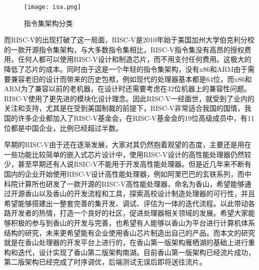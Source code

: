 \begin{figure}[htb]
    \centering
    \setlength\tabcolsep{3pt}  %
    \vspace{5pt} %
    \texttt{[image: isa.png]}
    \caption{指令集架构分类}
    \label{fig:figure13}
\end{figure}

而RISC-V的出现打破了这一局面，RISC-V是2010年始于美国加州大学伯克利分校的一款开源指令集架构\cite{riscv-overview}，与大多数指令集相比，RISC-V指令集没有高昂的授权费用，任何人都可以使用RISC-V设计和制造芯片，而不用支付任何费用。这极大的降低了芯片的成本。同时由于这是一个年轻的指令集架构，没有x86和ARM由于需要兼容老旧的设计而带来的历史包袱，例如现代的处理器基本都是64位，而x86和ARM为了兼容以前的老机器，在设计时还需要考虑在32位机器上的兼容性问题。RISC-V使用了更先进的模块化设计理念。因此RISC-V一经面世，就受到了业内的关注和支持，尤其是在受到美国制裁的前提下，RISC-V非常适合我国的国情，我国的许多企业都加入了RISC-V基金会，在RISC-V基金会的19位高级成员中，有11位都是中国企业，比例已经超过半数。


早期的RISC-V由于还在逐渐发展，大家对其仍然抱着观望的态度，主要还是用在一些功能比较简单的嵌入式芯片设计中，使用RISC-V设计的高性能处理器仍然较少，甚至早期还有人说RSIC-V不能用于开发高性能处理器。但是近几年来不断有国内的企业开始使用RISC-V设计高性能处理器，例如阿里巴巴的玄铁系列\cite{xuantie}，而中科院计算所也研发了一款开源的RISC-V高性能处理器，命名为香山\cite{xiangshan}，希望能够通过开源香山以及香山的开发流程和工具，探索高校设计制造处理器的可行性，并且希望能够搭建出一整套完善的集开发、调试、评估为一体的迭代流程。以此带动各路开发者的热情，打造一个良好的社区，促进处理器相关领域的发展。希望大家能够积极的参与到香山的开发与完善，也希望有人能够以香山为平台进行计算机体系结构的研究，未来更希望能有企业使用香山芯片制造出自己的产品。而本文的研究就是在香山处理器的开发平台上进行的，在香山第一版架构雁栖湖的基础上进行重构和迭代，设计实现了香山第二版架构南湖。目前香山第一版架构已经流片成功，第二版架构已经完成了时序调优，后端测试无误后即将送往流片。

